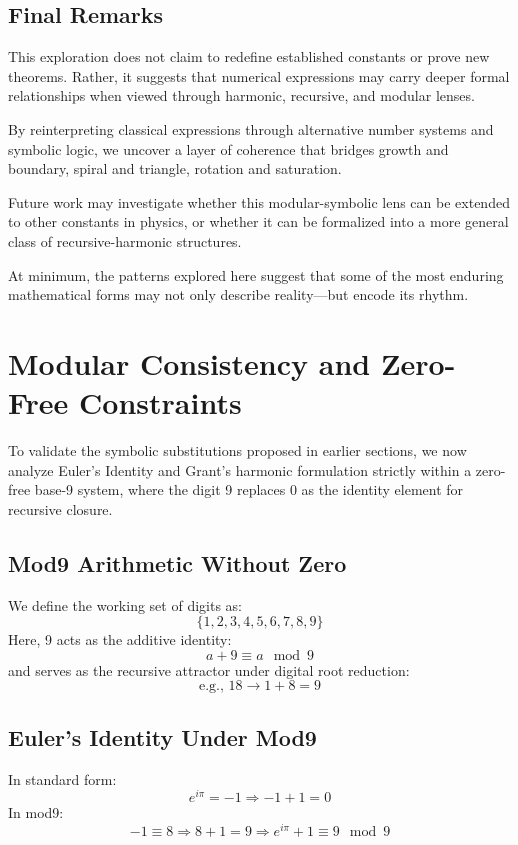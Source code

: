 \documentclass[12pt]{article}
\begin{document}
\subsection*{Final Remarks}

This exploration does not claim to redefine established constants or prove new theorems. Rather, it suggests that numerical expressions may carry deeper formal relationships when viewed through harmonic, recursive, and modular lenses.

By reinterpreting classical expressions through alternative number systems and symbolic logic, we uncover a layer of coherence that bridges growth and boundary, spiral and triangle, rotation and saturation.

Future work may investigate whether this modular-symbolic lens can be extended to other constants in physics, or whether it can be formalized into a more general class of recursive-harmonic structures. 

At minimum, the patterns explored here suggest that some of the most enduring mathematical forms may not only describe reality—but encode its rhythm.

\newpage
\section{Modular Consistency and Zero-Free Constraints}

To validate the symbolic substitutions proposed in earlier sections, we now analyze Euler’s Identity and Grant’s harmonic formulation strictly within a zero-free base-9 system, where the digit 9 replaces 0 as the identity element for recursive closure.

\subsection*{Mod9 Arithmetic Without Zero}

We define the working set of digits as:
\[
\{1, 2, 3, 4, 5, 6, 7, 8, 9\}
\]
Here, 9 acts as the additive identity:
\[
a + 9 \equiv a \mod 9
\]
and serves as the recursive attractor under digital root reduction:
\[
\text{e.g., } 18 \rightarrow 1 + 8 = 9
\]

\subsection*{Euler’s Identity Under Mod9}

In standard form:
\[
e^{i\pi} = -1 \Rightarrow -1 + 1 = 0
\]
In mod9:
\[
-1 \equiv 8 \Rightarrow 8 + 1 = 9
\Rightarrow e^{i\pi} + 1 \equiv 9 \mod 9
\]
\end{document}
